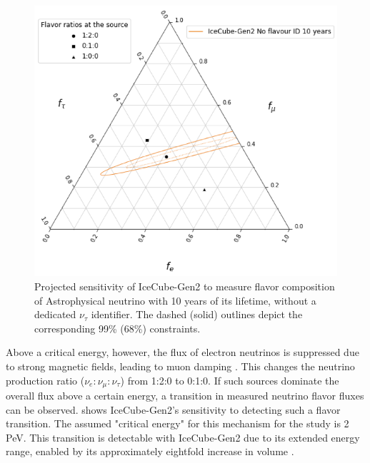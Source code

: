 \begin{figure}[h!]
    \centering
    \includegraphics{./figures/gen2/Gen2-10years_NONutau.png}
    \caption{Projected sensitivity of IceCube-Gen2 to measure flavor composition of Astrophysical neutrino with 10 years of its lifetime, without a dedicated $\nu_{\tau}$ identifier. The dashed (solid) outlines depict the corresponding 99\% (68\%) constraints.}
\end{figure}

Above a critical energy, however, the flux of electron neutrinos is suppressed due to strong magnetic fields, leading to muon damping  . This changes the neutrino production ratio ($\nu_e:\nu_{\mu}:\nu_{\tau}$) from 1:2:0 to 0:1:0. If such sources dominate the overall flux above a certain energy, a transition in measured neutrino flavor fluxes can be observed.  shows IceCube-Gen2's sensitivity to detecting such a flavor transition. The assumed "critical energy" for this mechanism for the study is 2 PeV. This transition is detectable with IceCube-Gen2 due to its extended energy range, enabled by its approximately eightfold increase in volume .

